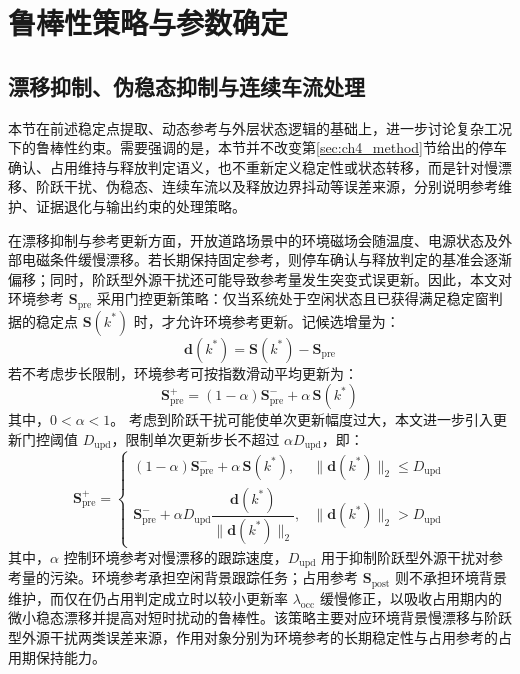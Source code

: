 \documentclass{xdupgthesis}
\begin{document}
\section{鲁棒性策略与参数确定}
\label{sec:ch4_robust}

\subsection{漂移抑制、伪稳态抑制与连续车流处理}
\label{subsec:ch4_drift_gate}

本节在前述稳定点提取、动态参考与外层状态逻辑的基础上，进一步讨论复杂工况下的鲁棒性约束。需要强调的是，本节并不改变第\ref{sec:ch4_method}节给出的停车确认、占用维持与释放判定语义，也不重新定义稳定性或状态转移，而是针对慢漂移、阶跃干扰、伪稳态、连续车流以及释放边界抖动等误差来源，分别说明参考维护、证据退化与输出约束的处理策略。

在漂移抑制与参考更新方面，开放道路场景中的环境磁场会随温度、电源状态及外部电磁条件缓慢漂移。若长期保持固定参考，则停车确认与释放判定的基准会逐渐偏移；同时，阶跃型外源干扰还可能导致参考量发生突变式误更新\cite{ch4_zhang2020railway}。因此，本文对环境参考 $\mathbf{S}_{\mathrm{pre}}$ 采用门控更新策略：仅当系统处于空闲状态且已获得满足稳定窗判据的稳定点 $\mathbf{S}(k^\ast)$ 时，才允许环境参考更新。记候选增量为：
\begin{equation}
    \mathbf{d}(k^\ast)=\mathbf{S}(k^\ast)-\mathbf{S}_{\mathrm{pre}}
\end{equation}
若不考虑步长限制，环境参考可按指数滑动平均更新为：
\begin{equation}
    \mathbf{S}_{\mathrm{pre}}^{+}=(1-\alpha)\mathbf{S}_{\mathrm{pre}}^{-}+\alpha\,\mathbf{S}(k^\ast)
\end{equation}
其中，$0<\alpha<1$。
考虑到阶跃干扰可能使单次更新幅度过大，本文进一步引入更新门控阈值 $D_{\mathrm{upd}}$，限制单次更新步长不超过 $\alpha D_{\mathrm{upd}}$，即：
\begin{equation}
    \mathbf{S}_{\mathrm{pre}}^{+}=
    \begin{cases}
        (1-\alpha)\mathbf{S}_{\mathrm{pre}}^{-}+\alpha\,\mathbf{S}(k^\ast), & \lVert\mathbf{d}(k^\ast)\rVert_2\le D_{\mathrm{upd}}\\
        \mathbf{S}_{\mathrm{pre}}^{-}+\alpha D_{\mathrm{upd}}\dfrac{\mathbf{d}(k^\ast)}{\lVert\mathbf{d}(k^\ast)\rVert_2}, & \lVert\mathbf{d}(k^\ast)\rVert_2>D_{\mathrm{upd}}
    \end{cases}
\end{equation}
其中，$\alpha$ 控制环境参考对慢漂移的跟踪速度，$D_{\mathrm{upd}}$ 用于抑制阶跃型外源干扰对参考量的污染。环境参考承担空闲背景跟踪任务；占用参考 $\mathbf{S}_{\mathrm{post}}$ 则不承担环境背景维护，而仅在仍占用判定成立时以较小更新率 $\lambda_{\mathrm{occ}}$ 缓慢修正，以吸收占用期内的微小稳态漂移并提高对短时扰动的鲁棒性。该策略主要对应环境背景慢漂移与阶跃型外源干扰两类误差来源，作用对象分别为环境参考的长期稳定性与占用参考的占用期保持能力。
\end{document}
